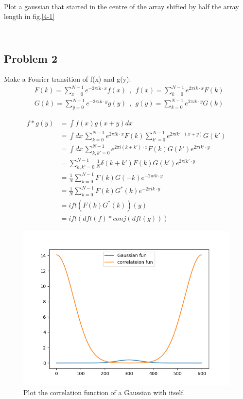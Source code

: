 \documentclass[showpacs, oneside, onecolumn, prl, amsmath, amssymb, nofootinbib, superscriptaddress, notitlepage]{revtex4-1}
\newcommand\ba{\begin{align}}
\newcommand\bas{\begin{align*}}
\newcommand\bfig{\begin{figure}}
\newcommand\efig{\end{figure}}
\begin{document}
Plot a gaussian that started in the centre of the array shifted by half the array length in fig.\ref{4-1}

~~~~

\subsection{Problem 2}

Make a Fourier transition of f(x) and g(y):
\ba
&F(k)=\sum_{x=0}^{N-1}e^{-2\pi ik\cdot x}f(x)\ \ ,\ \ f(x)=\sum_{k=0}^{N-1}e^{2\pi ik\cdot x}F(k)\\
&G(k)=\sum_{y=0}^{N-1}e^{-2\pi ik\cdot y}g(y)\ \ ,\ \ g(y)=\sum_{k=0}^{N-1}e^{2\pi ik\cdot y}G(k)
\end{align}

\bas
f*g(y)&=\int f(x)g(x+y)dx\\
&=\int dx\,\sum_{k=0}^{N-1}e^{2\pi ik\cdot x}F(k)\sum_{k'=0}^{N-1}e^{2\pi ik'\cdot(x+y)}G(k')\\
&=\int dx\,\sum_{k,k'=0}^{N-1}e^{2\pi i(k+k')\cdot x}F(k)G(k')e^{2\pi ik'\cdot y}\\
&=\sum_{k,k'=0}^{N-1}\frac1N\delta(k+k')F(k)G(k')e^{2\pi ik'\cdot y}\\
&=\frac1N \sum_{k=0}^{N-1}F(k)G(-k)e^{-2\pi ik\cdot y}\\
&=\frac1N \sum_{k=0}^{N-1}F(k)G^*(k)e^{-2\pi ik\cdot y}\\
&=ift(F(k)G^*(k))(y)\\
&=ift(dft(f)*conj(dft(g)))
\end{align*}

\bfig
	\centering
	\includegraphics[scale=1]{4-2.png}
	\caption{Plot the correlation function of a Gaussian with itself.}
	\label{4-2}
\efig
\end{document}
